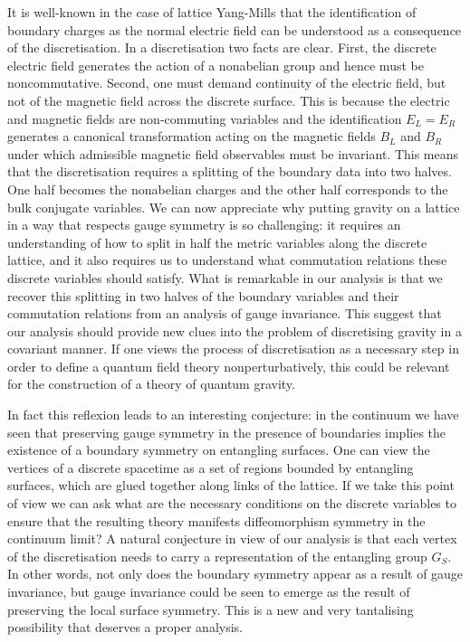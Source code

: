 \documentclass[a4paper,11pt]{article}
\begin{document}
It is well-known in the case of lattice Yang-Mills that the identification of boundary charges as the normal electric field can be understood as a consequence of the discretisation. 
In a discretisation two facts are clear.
First, the discrete electric field generates the action of a nonabelian group and hence must be noncommutative. 
Second, one must demand continuity of the electric field, but not of the magnetic field across the discrete surface.
This is because the electric and magnetic fields are non-commuting variables and the identification $E_L=E_R$  generates a canonical transformation acting on the magnetic fields $B_L$ and $B_R$ under which admissible magnetic field observables must be invariant. 
This means that the discretisation requires a splitting of the boundary data into two halves.
One half becomes the nonabelian charges and the other half corresponds to the bulk conjugate variables. 
We can now appreciate why putting gravity on a lattice in a way that respects gauge symmetry is so challenging: it requires an understanding of how to split in half the metric variables along the discrete lattice, and it also requires us to understand what commutation relations these discrete variables should satisfy.
What is remarkable in our analysis is that we recover this splitting in two halves of the boundary variables and their commutation relations from an analysis of gauge invariance.
This suggest that our analysis should provide new clues into the problem of discretising gravity in a covariant manner. 
If one views the process of discretisation as a necessary step in order to define a quantum field theory nonperturbatively, this could be relevant for the construction of a theory of quantum gravity. 

In fact this reflexion leads to an interesting conjecture: in the continuum we have seen that preserving gauge symmetry in the presence of boundaries implies the existence of a boundary symmetry on entangling surfaces.
One can view the vertices of a discrete spacetime as a set of regions bounded by entangling surfaces, which are glued together along links of the lattice.
If we take this point of view we can ask what are the necessary conditions on the discrete variables to ensure that the resulting theory manifests diffeomorphism symmetry in the continuum limit?
A natural conjecture in view of our analysis is that each vertex of the discretisation needs to carry a representation of the entangling group $G_S$.
In other words, not only does the boundary symmetry appear as a result of gauge invariance, but gauge invariance could be seen to emerge as the result of preserving the local surface symmetry. 
This is a new and very tantalising possibility that deserves a proper analysis.
\end{document}
